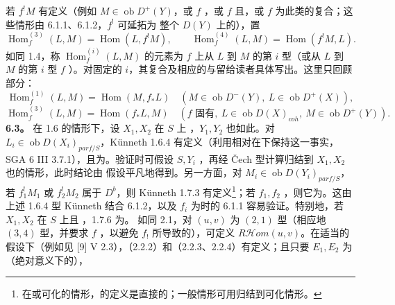 若 $f^!M$ 有定义（例如 $M\in\operatorname{ob}D^+(Y)$，或 $f$ ，或 $f$ 且，或 $f$ 为此类的复合；这些情形由 6.1.1、6.1.2，$f^!$ 可延拓为
整个 $D(Y)$ 上的），置
\[\operatorname{Hom}_f^{(3)}(L,M)=\operatorname{Hom}(L,f^!M),\qquad\operatorname{Hom}_f^{(4)}(L,M)=\operatorname{Hom}(f^!M,L).\]
如同 1.4，称 $\operatorname{Hom}_f^{(i)}(L,M)$ 的元素为 $f$ 上从 $L$ 到 $M$ 的第 $i$ 型（或从 $L$ 到 $M$ 的第 $i$ 型 $f$ ）。对固定的 $i$，其复合及相应的与留给读者具体写出。这里只回顾部分：
\[\operatorname{Hom}_f^{(1)}(L,M)=\operatorname{Hom}(M,f_*L)\quad(M\in\operatorname{ob}D^-(Y),\ L\in\operatorname{ob}D^+(X)),\]
\[\operatorname{Hom}_f^{(3)}(L,M)=\operatorname{Hom}(f_*L,M)\quad(f\text{ 固有},\ L\in\operatorname{ob}D(X)_{coh},\ M\in\operatorname{ob}D^+(Y)).\]
\textbf{6.3。} 在 1.6 的情形下，设 $X_1,X_2$ 在 $S$ 上 ，$Y_1,Y_2$ 也如此。对 $L_i\in\operatorname{ob}D(X_i)_{parf/S}$，Künneth  1.6.4 有定义（利用相对在下保持这一事实，SGA 6 III 3.7.1），且为。验证时可假设 $S,Y_i$ ，再经 Čech 型计算归结到 $X_1,X_2$ 也的情形，此时结论由 假设平凡地得到。另一方面，对 $M_i\in\operatorname{ob}D(Y_i)_{parf/S}$，若 $f_1^!M_1$ 或 $f_2^!M_2$ 属于 $D^b$，则 Künneth  1.7.3 有定义\footnote{在或可化的情形，的定义是直接的；一般情形可用归结到可化情形。}；若 $f_1,f_2$ ，则它为。这由上述 1.6.4 型 Künneth 结合 6.1.2，以及 $f_i$ 为时的 6.1.1 容易验证。特别地，若 $X_1,X_2$ 在 $S$ 上且 ，1.7.6 为。
如同 2.1，对 $(u,v)$ 为 $(2,1)$ 型（相应地 $(3,4)$ 型，并要求 $f$ ，以避免 $f_!$ 所导致的），可定义 $R\mathcal Hom(u,v)$。在适当的假设下（例如见 [9] V 2.3），（2.2.2）和（2.2.3、2.2.4）有定义；且只要 $E_1,E_2$ 为（绝对意义下的），
